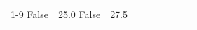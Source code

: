 \begin{table}[H]
\begin{tabular}{lllrlllll}
\cline{1-9}
False & 25.0%
\cline{1-9}
False & 27.5%

\end{tabular}
\end{table}
